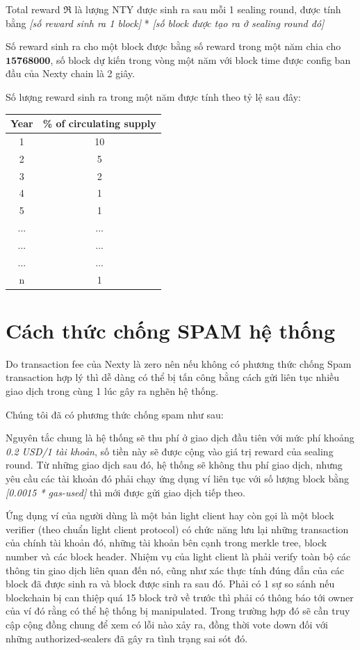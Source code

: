 \documentclass[12pt,oneside]{amsart}
\begin{document}
\begin{multicols}{2}
Total reward $\Re$ là lượng NTY được sinh ra sau mỗi 1 sealing round, được tính bằng \textit{[số reward sinh ra 1 block]} * \textit{[số block được tạo ra ở sealing round đó]}

Số reward sinh ra cho một block được bằng số reward trong một năm chia cho $\mathbf{15768000}$, số block dự kiến trong vòng một năm với block time được config ban đầu của Nexty chain là 2 giây.

Số lượng reward sinh ra trong một năm được tính theo tỷ lệ sau đây:

\begin{center}
  \begin{tabular}{@{} cc @{}}
    \hline
    Year &  \% of circulating supply \\ 
    \hline
    1 & 10 \\ 
    2 & 5 \\ 
    3 & 2 \\ 
    4 & 1 \\ 
    5 & 1 \\     
    ... & ... \\ 
    ... & ... \\ 
    ... & ... \\ 
    n &  1 \\
    \hline
  \end{tabular}
\end{center}

\section{Cách thức chống SPAM hệ thống}

Do transaction fee của Nexty là zero nên nếu không có phương thức chống Spam transaction hợp lý thì dễ dàng có thể bị tấn công bằng cách gửi liên tục nhiều giao dịch trong cùng 1 lúc gây ra nghẽn hệ thống.

Chúng tôi đã có phương thức chống spam như sau:

Nguyên tắc chung là hệ thống sẽ thu phí ở giao dịch đầu tiên với mức phí khoảng \textit{0.2 USD/1 tài khoản}, số tiền này sẽ được cộng vào giá trị reward của sealing round. Từ những giao dịch sau đó, hệ thống sẽ không thu phí giao dịch, nhưng yêu cầu các tài khoản đó phải chạy ứng dụng ví liên tục với số lượng block bằng \textit{[0.0015 * gas-used]} thì mới được gửi giao dịch tiếp theo.

Ứng dụng ví của người dùng là một bản light client hay còn gọi là một block verifier (theo chuẩn light client protocol) có chức năng lưu lại những transaction của chính tài khoản đó, những tài khoản bên cạnh trong merkle tree, block number và các block header. Nhiệm vụ của light client là phải verify toàn bộ các thông tin giao dịch liên quan đến nó, cũng như xác thực tính đúng đắn của các block đã được sinh ra và block được sinh ra sau đó. Phải có 1 sự so sánh nếu blockchain bị can thiệp quá 15 block trở về trước thì phải có thông báo tới owner của ví đó rằng có thể hệ thống bị manipulated. Trong trường hợp đó sẽ cần truy cập cộng đồng chung để xem có lỗi nào xảy ra, đồng thời vote down đối với những authorized-sealers đã gây ra tình trạng sai sót đó.


\end{multicols}
\end{document}
